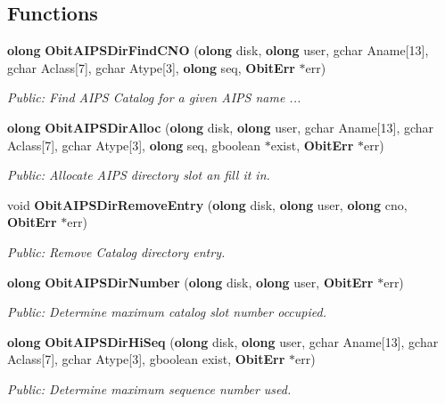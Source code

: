 \subsection*{Functions}
\begin{CompactItemize}
\item 
{\bf olong} {\bf Obit\-AIPSDir\-Find\-CNO} ({\bf olong} disk, {\bf olong} user, gchar Aname[13], gchar Aclass[7], gchar Atype[3], {\bf olong} seq, {\bf Obit\-Err} $\ast$err)
\begin{CompactList}\small\item\em Public: Find AIPS Catalog for a given AIPS name ... \item\end{CompactList}\item 
{\bf olong} {\bf Obit\-AIPSDir\-Alloc} ({\bf olong} disk, {\bf olong} user, gchar Aname[13], gchar Aclass[7], gchar Atype[3], {\bf olong} seq, gboolean $\ast$exist, {\bf Obit\-Err} $\ast$err)
\begin{CompactList}\small\item\em Public: Allocate AIPS directory slot an fill it in. \item\end{CompactList}\item 
void {\bf Obit\-AIPSDir\-Remove\-Entry} ({\bf olong} disk, {\bf olong} user, {\bf olong} cno, {\bf Obit\-Err} $\ast$err)
\begin{CompactList}\small\item\em Public: Remove Catalog directory entry. \item\end{CompactList}\item 
{\bf olong} {\bf Obit\-AIPSDir\-Number} ({\bf olong} disk, {\bf olong} user, {\bf Obit\-Err} $\ast$err)
\begin{CompactList}\small\item\em Public: Determine maximum catalog slot number occupied. \item\end{CompactList}\item 
{\bf olong} {\bf Obit\-AIPSDir\-Hi\-Seq} ({\bf olong} disk, {\bf olong} user, gchar Aname[13], gchar Aclass[7], gchar Atype[3], gboolean exist, {\bf Obit\-Err} $\ast$err)
\begin{CompactList}\small\item\em Public: Determine maximum sequence number used. \item\end{CompactList}\item 

\end{CompactItemize}
